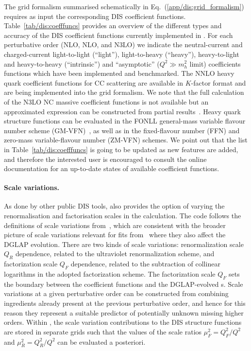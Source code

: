 The grid formalism summarised schematically in
Eq.~(\ref{app/dis:grid_formalism}) requires as input the corresponding DIS
coefficient functions.
%
Table~\ref{tab/dis:coefffuncs} provides an overview of the different types and
accuracy of the DIS coefficient functions currently implemented in \yadism.
%
For each perturbative order (NLO, NLO, and N3LO) we indicate  the
neutral-current and charged-current light-to-light (``light''), light-to-heavy
(``heavy''), heavy-to-light and heavy-to-heavy (``intrinsic'') and
``asymptotic'' ($Q^2 \gg m_h^2$ limit)  coefficients functions which have been
implemented and benchmarked.
%
The NNLO heavy quark coefficient functions for CC scattering are available in
$K$-factor format and are being implemented into the \yadism grid formalism.
%
We note that the full calculation of the N3LO NC massive coefficient functions
is not available but an approximated expression can be constructed from partial
results~\cite{niccolo}.
%
Heavy quark structure functions can be evaluated in the FONLL general-mass
variable flavour number scheme (GM-VFN)~\cite{Forte:2010ta}, as well as in the
fixed-flavour number (FFN) and zero-mass variable-flavour number (ZM-VFN)
schemes.
%
We point out that the list in Table~\ref{tab/dis:coefffuncs} is going to be
updated as new features are added, and therefore the interested user is
encouraged to consult the online documentation for an up-to-date states of
available coefficient functions.



\paragraph{Scale variations.}
%
As done by other public DIS tools, \yadism also provides the option of varying
the renormalisation and factorisation scales in the calculation.
%
The code follows the definitions of scale variations
from~\cite{vanNeerven:2000uj,vanNeerven:2001pe}, which are consistent with the
broader picture of scale variations relevant for \pdf{} fits
from~\cite{NNPDF:2019ubu} where they also affect the DGLAP evolution.
%
There are two kinds of scale variations: renormalization scale $Q_R$
dependence, related to the ultraviolet renormalization scheme, and
factorization scale $Q_F$ dependence, related to the subtraction of collinear
logarithms in the adopted factorization scheme.
%
The factorization scale $Q_F$ sets  the boundary between the coefficient
functions and the DGLAP-evolved \pdf{}s.
%
Scale variations at a given perturbative order can be constructed from
combining ingredients already present at the previous perturbative order, and
hence for this reason they represent a suitable predictor of potentially
unknown missing higher orders.
%
Within \yadism, the scale variation contributions to the DIS structure
functions are stored in separate grids such that the values of the scale ratios
$\mu_F^2=Q_F^2/Q^2$ and $\mu_R^2=Q_R^2/Q^2$ can be evaluated a posteriori.

